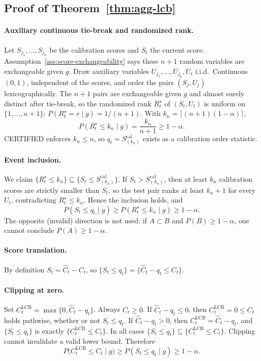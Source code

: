 \subsection{Proof of Theorem~\ref{thm:agg-lcb}}
\label{app:proof_agg_lcb}

\paragraph{Auxiliary continuous tie-break and randomized rank.}
Let $S_{j_1},\ldots,S_{j_n}$ be the calibration scores and $S_t$ the current
score.  Assumption~\ref{ass:score-exchangeability} says these $n+1$ random
variables are exchangeable given $g$.  Draw auxiliary variables
$U_{j_1},\ldots,U_{j_n},U_t$ i.i.d.\ Continuous$(0,1)$, independent of the
scores, and order the pairs $(S_j,U_j)$ lexicographically.  The $n+1$ pairs
are exchangeable given $g$ and almost surely distinct after tie-break, so the
randomized rank $R_t^\star$ of $(S_t,U_t)$ is uniform on $\{1,\ldots,n+1\}$:
$P(R_t^\star=r\mid g)=1/(n+1)$.  With
$k_n=\lceil(n+1)(1-\alpha)\rceil$,
\[
 P(R_t^\star\le k_n\mid g)=\frac{k_n}{n+1}\ge 1-\alpha.
\]
CERTIFIED enforces $k_n\le n$, so $q_t=S_{(k_n)}^{\mathrm{cal}}$ exists as a
calibration order statistic.

\paragraph{Event inclusion.}
We claim $\{R_t^\star\le k_n\}\subseteq\{S_t\le S_{(k_n)}^{\mathrm{cal}}\}$.
If $S_t>S_{(k_n)}^{\mathrm{cal}}$, then at least $k_n$ calibration scores are
strictly smaller than $S_t$, so the test pair ranks at least $k_n+1$ for every
$U_t$, contradicting $R_t^\star\le k_n$.  Hence the inclusion holds, and
\[
 P(S_t\le q_t\mid g)
 \ge
 P(R_t^\star\le k_n\mid g)
 \ge 1-\alpha.
\]
The opposite (invalid) direction is not used: if $A\subset B$ and
$P(B)\ge 1-\alpha$, one cannot conclude $P(A)\ge 1-\alpha$.

\paragraph{Score translation.}
By definition $S_t=\widehat C_t-C_t$, so
$\{S_t\le q_t\}=\{\widehat C_t-q_t\le C_t\}$.

\paragraph{Clipping at zero.}
Set $C^{\mathrm{LCB}}_t=\max\{0,\widehat C_t-q_t\}$.  Always $C_t\ge 0$.
If $\widehat C_t-q_t\le 0$, then $C^{\mathrm{LCB}}_t=0\le C_t$ holds pathwise,
whether or not $S_t\le q_t$.  If $\widehat C_t-q_t>0$, then
$C^{\mathrm{LCB}}_t=\widehat C_t-q_t$, and $\{S_t\le q_t\}$ is exactly
$\{C^{\mathrm{LCB}}_t\le C_t\}$.  In all cases
$\{S_t\le q_t\}\subseteq\{C^{\mathrm{LCB}}_t\le C_t\}$.  Clipping cannot
invalidate a valid lower bound.  Therefore
\[
 P\bigl(C^{\mathrm{LCB}}_t\le C_t\mid g\bigr)
 \ge
 P(S_t\le q_t\mid g)
 \ge 1-\alpha.
\]


